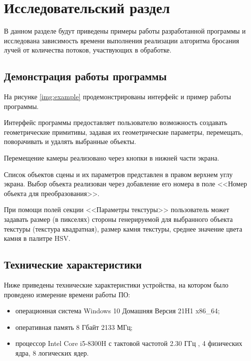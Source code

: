 \chapter{Исследовательский раздел}

В данном разделе будут приведены примеры работы разработанной программы и исследована зависимость времени выполнения реализации алгоритма бросания лучей от количества потоков, участвующих в обработке.

\section{Демонстрация работы программы}

На рисунке \ref{img:example} продемонстрированы интерфейс и пример работы программы.


Интерфейс программы предоставляет пользователю возможность создавать геометрические примитивы, задавая их геометрические параметры, перемещать, поворачивать и удалять выбранные объекты.

Перемещение камеры реализовано через кнопки в нижней части экрана.

Список объектов сцены и их параметров представлен в правом верхнем углу экрана. Выбор объекта реализован через добавление его номера в поле <<Номер объекта для преобразования>>.

При помощи полей секции <<Параметры текстуры>> пользователь может задавать размер (в пикселях) стороны генерируемой для выбранного объекта текстуры (текстура квадратная), размер камня текстуры, среднее значение цвета камня в палитре HSV.

\section{Технические характеристики}

Ниже приведены технические характеристики устройства, на котором было проведено измерение времени работы ПО:

\begin{itemize}
	\item операционная система Windows 10 Домашняя Версия 21H1 \cite{windows} x86\_64;
	\item оперативная память 8 Гбайт 2133 МГц;
	\item процессор Intel Core i5-8300H с тактовой частотой 2.30 ГГц \cite{intel}, 4 физических ядра, 8 логических ядер.
\end{itemize}


